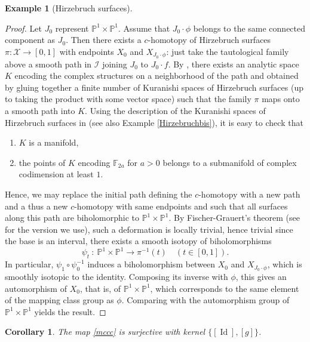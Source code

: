 \documentclass[10pt]{amsart}
\let\mathcal\mathscr
\DeclareMathOperator{\Id}{Id}
\theoremstyle{plain}
\newtheorem{corollary}[theorem]{Corollary}
\theoremstyle{definition}
\newtheorem{example}[theorem]{Example}
\theoremstyle{remark}
\numberwithin{equation}{section}
\newcommand{\cI}{\mathcal{I}}
\begin{document}
\begin{example}[Hirzebruch surfaces]
\begin{proof}
Let $J_0$ represent $\mathbb P^1\times\mathbb P^1$.
Assume that $J_0\cdot \phi$ belongs to the same connected component as $J_0$. Then there exists a $c$-homotopy of Hirzebruch surfaces \hbox{$\pi : \mathcal X\!\to\![0,1]$} with endpoints $X_0$ and $X_{J_0\cdot \phi}$: just take the tautological family above a smooth path in $\cI$ joining $J_0$ to $J_0\cdot f$. By \cite[Th.\,8.1]{circle}, there exists an analytic space $K$ encoding the complex structures on a neighborhood of the path and obtained by gluing together a finite number of Kuranishi spaces of Hirzebruch surfaces (up to taking the product with some vector space) such that the family $\pi$ maps onto a smooth path into $K$. Using the description of the Kuranishi spaces of Hirzebruch surfaces in \cite[p.\,21]{Cat} (see also Example \ref{Hirzebruchbis}), it is easy to check that
\begin{enumerate}
\item
$K$ is a manifold,
\item
the points of $K$ encoding $\mathbb F_{2a}$ for $a>0$ belongs to a submanifold of complex codimension at least $1$.
\end{enumerate}
Hence, we may replace the initial path defining the $c$-homotopy with a new path and a thus a new $c$-homotopy with same endpoints and such that all surfaces along this path are biholomorphic to $\mathbb P^1\times\mathbb P^1$. By Fischer-Grauert's theorem (see \cite{PS} for the version we use), such a deformation is locally trivial, hence trivial since the base is an interval, \ie there exists a smooth isotopy of biholomorphisms
\begin{equation}
\label{isotopy}
\psi_t\ :\ \mathbb P^1\times\mathbb P^1\to \pi^{-1}(t)\quad (t\in [0,1]).
\end{equation}
In particular, $\psi_1\circ\psi_0^{-1}$
induces a biholomorphism between $X_0$ and $X_{J_0\cdot\phi}$, which is smoothly isotopic to the identity. Composing its inverse with $\phi$, this gives an automorphism of $X_0$, that is, of $\mathbb P^1\times\mathbb P^1$, which corresponds to the same element of the mapping class group as $\phi$. Comparing with the automorphism group of $\mathbb P^1\times\mathbb P^1$ yields the result.
\end{proof}

\begin{corollary}
\label{Hirzebruchcc2}
The map \eqref{mccc} is surjective with kernel $\{[\Id], [g]\}$.
\end{corollary}


\end{example}
\end{document}
